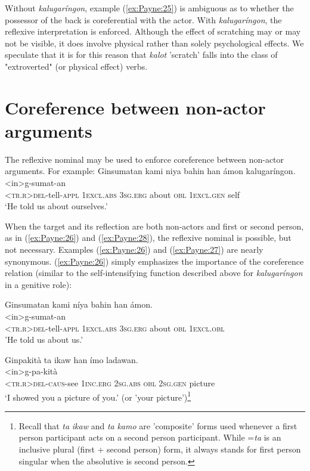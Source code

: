 \documentclass[output=paper]{langscibook}
\begin{document}
Without \textit{kalugaríngon}, example (\ref{ex:Payne:25}) is ambiguous as to whether the possessor of the back is coreferential with the actor. With \textit{kalugaríngon}, the reflexive interpretation is enforced. Although the effect of scratching may or may not be visible, it does involve physical rather than solely psychological effects. We speculate that it is for this reason that \textit{kalot} 'scratch' falls into the class of "extroverted" (or physical effect) verbs. 

\section{Coreference between non-actor arguments} 
\label{sec:Payne:6}
The reflexive nominal may be used to enforce coreference between non-actor arguments. For example:
\ea
 \label{ex:Payne:26}
 \glll
 Ginsumatan kami niya bahin han ámon kalugaríngon.\\
 <in>g-sumat-an { } { } { } { } { } { } \\
\textsc{<tr.r}>\textsc{del-}tell-\textsc{appl} 1\textsc{excl.abs} 3\textsc{sg.erg} about \textsc{obl} 1\textsc{excl.gen} self\\
 \glt ‘He told us about ourselves.'
\z

When the target and its reflection are both non-actors and first or second person, as in (\ref{ex:Payne:26}) and (\ref{ex:Payne:28}), the reflexive nominal is possible, but not necessary. Examples (\ref{ex:Payne:26}) and (\ref{ex:Payne:27}) are nearly synonymous. (\ref{ex:Payne:26}) simply emphasizes the importance of the coreference relation (similar to the self-intensifying function described above for \textit{kalugaríngon} in a genitive role):%

\ea
 \label{ex:Payne:27}
 \glll
Ginsumatan kami níya bahin han ámon.\\
 <in>g-sumat-an { } { } { } { } { } \\
\textsc{ <tr.r}>\textsc{del-}tell-\textsc{appl} 1\textsc{excl.abs} 3\textsc{sg.erg} about \textsc{obl} 1\textsc{excl.obl}\\
 \glt'He told us about us.'
\z

\ea
\label{ex:Payne:28}
\glll
 Ginpakità ta ikaw han ímo ladawan.\\
 <in>g-pa-kità { } { } { } { } { } \\
 \textsc{<tr.r>del-caus}-see 1\textsc{inc.erg} \textsc{2sg.abs} \textsc{obl} 2\textsc{sg.gen} picture\\
 \glt ‘I showed you a picture of you.' (or 'your picture')\footnote{Recall that \textit{ta} \textit{ikaw} and \textit{ta} \textit{kamo} are 'composite' forms used whenever a first person participant acts on a second person participant. While =\textit{ta} is an inclusive plural (first + second person) form, it always stands for first person singular when the absolutive is second person.}
 \z
\end{document}
